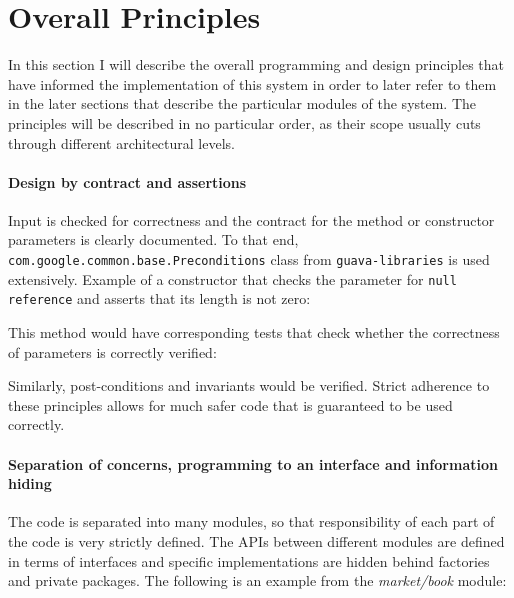 \section{Overall Principles}
In this section I will describe the overall programming and design principles that have informed the implementation of this system in order to later refer to them in the later sections that describe the particular modules of the system. The principles will be described in no particular order, as their scope usually cuts through different architectural levels.

\paragraph{Design by contract and assertions} 
Input is checked for correctness and the contract for the method or constructor parameters is clearly documented. To that end, \texttt{com.google.common.base.Preconditions} class from \texttt{guava-libraries}\cite{guava} is used extensively. Example of a constructor that checks the parameter for \texttt{null reference} and asserts that its length is not zero:


This method would have corresponding tests that check whether the correctness of parameters is correctly verified:


Similarly, post-conditions and invariants would be verified. Strict adherence to these principles allows for much safer code that is guaranteed to be used correctly.

\paragraph{Separation of concerns, programming to an interface and information hiding}
The code is separated into many modules, so that responsibility of each part of the code is very strictly defined. The APIs between different modules are defined in terms of interfaces and specific implementations are hidden behind factories and private packages. The following is an example from the \textit{market/book} module:



